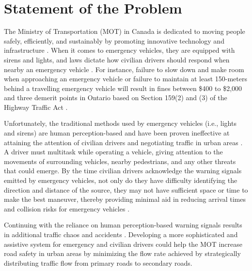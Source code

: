 \section{Statement of the Problem}
The Ministry of Transportation (MOT) in Canada is dedicated to moving people safely, efficiently, and sustainably by promoting innovative technology and infrastructure \cite{MTO_2020}. When it comes to emergency vehicles, they are equipped with sirens and lights, and laws dictate how civilian drivers should respond when nearby an emergency vehicle \cite{MTO_2020}. For instance, failure to slow down and make room when approaching an emergency vehicle or failure to maintain at least 150-meters behind a travelling emergency vehicle will result in fines between \$400 to \$2,000 and three demerit points in Ontario based on Section 159(2) and (3) of the Highway Traffic Act \cite{MoveOver_2021, MTO_2020}. 

Unfortunately, the traditional methods used by emergency vehicles (i.e., lights and sirens) are human perception-based and have been proven ineffective at attaining the attention of civilian drivers and negotiating traffic in urban areas \cite{Buchenscheit2009, Missikpode2018}. A driver must multitask while operating a vehicle, giving attention to the movements of surrounding vehicles, nearby pedestrians, and any other threats that could emerge. By the time civilian drivers acknowledge the warning signals emitted by emergency vehicles, not only do they have difficulty identifying the direction and distance of the source, they may not have sufficient space or time to make the best maneuver, thereby providing minimal aid in reducing arrival times and collision risks for emergency vehicles \cite{McDonald2013, Buchenscheit2009}.

Continuing with the reliance on human perception-based warning signals results in additional traffic chaos and accidents \cite{McDonald2013, Missikpode2018}. Developing a more sophisticated and assistive system for emergency and civilian drivers could help the MOT increase road safety in urban areas by minimizing the flow rate achieved by strategically distributing traffic flow from primary roads to secondary roads. 

